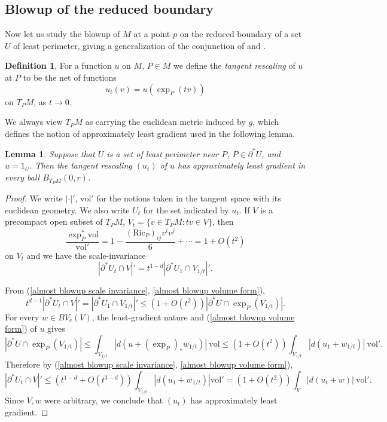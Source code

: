 \documentclass[reqno,12pt,letterpaper]{amsart}
\newcommand{\Ric}{\mathrm{Ric}}
\newcommand{\vol}{\mathrm{vol}}
\newcommand{\dfn}[1]{\emph{#1}\index{#1}}
\newtheorem{lemma}[theorem]{Lemma}
\theoremstyle{definition}
\newtheorem{definition}[theorem]{Definition}
\numberwithin{equation}{section}
\begin{document}
\subsection{Blowup of the reduced boundary}
Now let us study the blowup of $M$ at a point $p$ on the reduced boundary of a set $U$ of least perimeter, giving a generalization of the conjunction of \cite[Theorem 9.3]{Giusti77} and \cite[Theorem 6.2.2]{Simons68}.

\begin{definition}
For a function $u$ on $M$, $P \in M$ we define the \dfn{tangent rescaling} of $u$ at $P$ to be the net of functions
$$u_t(v) = u\left(\exp_P(tv)\right)$$
on $T_PM$, as $t \to 0$.
\end{definition}

We always view $T_PM$ as carrying the euclidean metric induced by $g$, which defines the notion of approximately least gradient used in the following lemma.

\begin{lemma}\label{almost blowup theorem}
Suppose that $U$ is a set of least perimeter near $P$, $P \in \partial^* U$, and $u = 1_U$.
Then the tangent rescaling $(u_t)$ of $u$ has approximately least gradient in every ball $B_{T_PM}(0, r)$.
\end{lemma}
\begin{proof}
We write $|\cdot|'$, $\vol'$ for the notions taken in the tangent space with its euclidean geometry.
We also write $U_t$ for the set indicated by $u_t$.
If $V$ is a precompact open subset of $T_PM$, $V_t = \{v \in T_PM: tv \in V\}$, then
\begin{equation}\label{almost blowup volume form}
\frac{\exp_P^* \vol}{\vol'} = 1 - \frac{(\Ric_P)_{ij}v^iv^j}{6} + \cdots = 1 + O(t^2)
\end{equation}
on $V_t$ and we have the scale-invariance
\begin{equation}\label{almost blowup scale invariance}
|\partial^* U_t \cap V|' = t^{1 - d}|\partial^* U_1 \cap V_{1/t}|'.
\end{equation}

From (\ref{almost blowup scale invariance}, \ref{almost blowup volume form}),
$$t^{d - 1} |\partial^* U_t \cap V|' = |\partial^* U_1 \cap V_{1/t}|' \leq (1 + O(t^2)) |\partial^* U \cap \exp_P(V_{1/t})|.$$
For every $w \in BV_c(V)$, the least-gradient nature and (\ref{almost blowup volume form}) of $u$ gives
$$|\partial^* U \cap \exp_P(V_{1/t})| \leq \int_{V_{1/t}} |d(u + (\exp_P)_* w_{1/t})| ~\vol \leq (1 + O(t^2))\int_{V_{1/t}} |d(u_1 + w_{1/t})| ~\vol'.$$
Therefore by (\ref{almost blowup scale invariance}, \ref{almost blowup volume form}),
$$|\partial^* U_t \cap V|' \leq (t^{1 - d} + O(t^{3 - d})) \int_{V_{1/t}} |d(u_1 + w_{1/t})| \vol' = (1 + O(t^2)) \int_V |d(u_t + w)| ~\vol'.$$
Since $V,w$ were arbitrary, we conclude that $(u_t)$ has approximately least gradient.
\end{proof}
\end{document}
